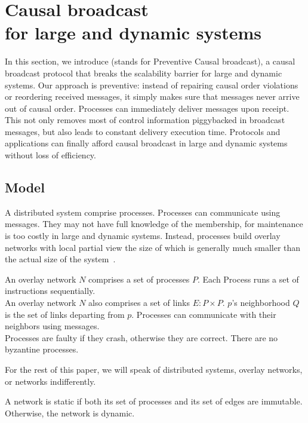 
\section{Causal broadcast\\for large and dynamic systems}
\label{sec:proposal}

In this section, we introduce \CBROADCAST (stands for Preventive Causal
broadcast), a causal broadcast protocol that breaks the scalability barrier for
large and dynamic systems.  Our approach is preventive: instead of repairing
causal order violations or reordering received messages, it simply makes sure
that messages never arrive out of causal order. Processes can immediately
deliver messages upon receipt. This not only removes most of control information
piggybacked in broadcast messages, but also leads to constant delivery execution
time. Protocols and applications can finally afford causal broadcast in large
and dynamic systems without loss of efficiency.

\subsection{Model}

A distributed system comprise processes. Processes can communicate using
messages. They may not have full knowledge of the membership, for maintenance is
too costly in large and dynamic systems. Instead, processes build overlay
networks with local partial view the size of which is generally much smaller
than the actual size of the
system~\cite{bertier-d2ht,jelasity2007gossip,jelasity2009tman}.

\begin{definition}
  An overlay network $N$ comprises a set of processes $P$. Each Process runs a
  set of instructions sequentially. \\
  An overlay network $N$ also comprises a set of links $E: P \times P$. $p$'s
  neighborhood $Q$ is the set of links departing from $p$. Processes can
  communicate with their neighbors using messages. \\
  Processes are faulty if they crash, otherwise they are correct. %
  There are no byzantine processes.
\end{definition}

For the rest of this paper, we will speak of distributed systems, overlay
networks, or networks indifferently.

\begin{definition}
  A network is static if both its set of processes and its set of edges are
  immutable. Otherwise, the network is dynamic.
\end{definition}

